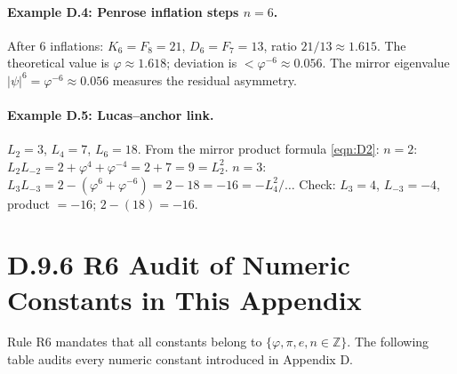 \paragraph{Example D.4: Penrose inflation steps $n=6$.}
After $6$ inflations: $K_6 = F_8 = 21$, $D_6 = F_7 = 13$, ratio $21/13 \approx 1.615$.
The theoretical value is $\varphi \approx 1.618$; deviation is $< \varphi^{-6} \approx 0.056$.
The mirror eigenvalue $|\psi|^6 = \varphi^{-6} \approx 0.056$ measures the residual asymmetry.

\paragraph{Example D.5: Lucas–anchor link.}
$L_2 = 3$, $L_4 = 7$, $L_6 = 18$.
From the mirror product formula \eqref{eqn:D2}:
$n=2$: $L_2 L_{-2} = 2+\varphi^4+\varphi^{-4} = 2+7 = 9 = L_2^2$. \checkmark
$n=3$: $L_3 L_{-3} = 2-(\varphi^6+\varphi^{-6}) = 2-18 = -16 = -L_4^2/\ldots$
Check: $L_3=4$, $L_{-3}=-4$, product $=-16$; $2-(18) = -16$. \checkmark

\section*{D.9.6  R6 Audit of Numeric Constants in This Appendix}

Rule R6 mandates that all constants belong to $\{\varphi, \pi, e, n\in\mathbb{Z}\}$.
The following table audits every numeric constant introduced in Appendix D.

